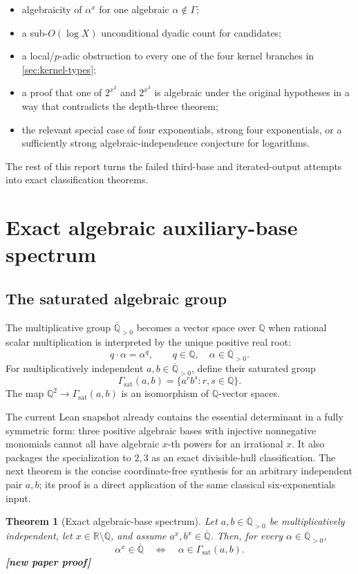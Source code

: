 \documentclass[11pt,oneside]{article}
\newtheorem{theorem}{Theorem}[section]
\theoremstyle{definition}
\theoremstyle{remark}
\newcommand{\Q}{\mathbb Q}
\newcommand{\R}{\mathbb R}
\newcommand{\Qbar}{\overline{\mathbb Q}}
\newcommand{\Apos}{\overline{\mathbb Q}_{>0}}
\newcommand{\GammaSat}{\Gamma_{\mathrm{sat}}}
\newcommand{\statusnew}{\textcolor{NewViolet}{\textbf{[new paper proof]}}}
\begin{document}
\begin{itemize}
\item algebraicity of $\alpha^x$ for one algebraic $\alpha\notin\Gamma$;
\item a sub-$O(\log X)$ unconditional dyadic count for candidates;
\item a local/$p$-adic obstruction to every one of the four kernel branches in
      \cref{sec:kernel-types};
\item a proof that one of $2^{x^2}$ and $2^{x^3}$ is algebraic under the original hypotheses
      in a way that contradicts the depth-three theorem;
\item the relevant special case of four exponentials, strong four exponentials, or a
      sufficiently strong algebraic-independence conjecture for logarithms.
\end{itemize}

The rest of this report turns the failed third-base and iterated-output attempts into exact
classification theorems.

\section{Exact algebraic auxiliary-base spectrum}\label{sec:spectrum}

\subsection{The saturated algebraic group}

The multiplicative group $\Apos$ becomes a vector space over $\Q$ when rational scalar
multiplication is interpreted by the unique positive real root:
\[
 q\cdot\alpha=\alpha^q,
 \qquad q\in\Q,
 \quad \alpha\in\Apos.
\]
For multiplicatively independent $a,b\in\Apos$, define their saturated group
\[
  \GammaSat(a,b)=\{a^r b^s:r,s\in\Q\}.
\]
The map $\Q^2\to\GammaSat(a,b)$ is an isomorphism of $\Q$-vector spaces.

The current Lean snapshot already contains the essential determinant in a fully symmetric
form: three positive algebraic bases with injective nonnegative monomials cannot all have
algebraic $x$-th powers for an irrational $x$.  It also packages the specialization to
$2,3$ as an exact divisible-hull classification.  The next theorem is the concise
coordinate-free synthesis for an arbitrary independent pair $a,b$; its proof is a direct
application of the same classical six-exponentials input.

\begin{theorem}[Exact algebraic-base spectrum]\label{thm:general-spectrum}
Let $a,b\in\Apos$ be multiplicatively independent, let $x\in\R\setminus\Q$, and assume
$a^x,b^x\in\Qbar$.  Then, for every $\alpha\in\Apos$,
\[
  \alpha^x\in\Qbar
  \quad\Longleftrightarrow\quad
  \alpha\in\GammaSat(a,b).
\]
\statusnew
\end{theorem}
\end{document}
